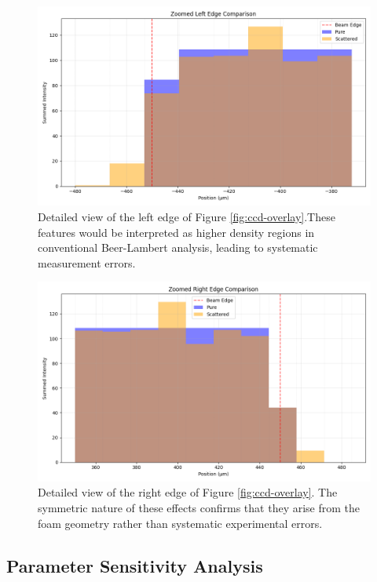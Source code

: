 \documentclass[twocolumn]{aastex701}
\begin{document}
\begin{figure}[htbp]
  \centering
  \includegraphics[width=\linewidth]{zoomed_left_edge_new.png}
  \caption{Detailed view of the left edge of Figure \ref{fig:ccd-overlay}.These features would be interpreted as higher density regions in conventional Beer-Lambert analysis, leading to systematic measurement errors.}
  \label{fig:ccd-left-edge}
\end{figure}

\begin{figure}[htbp]
  \centering
  \includegraphics[width=\linewidth]{zoomed_right_edge_new.png}
  \caption{Detailed view of the right edge of Figure \ref{fig:ccd-overlay}. The symmetric nature of these effects confirms that they arise from the foam geometry rather than systematic experimental errors.}
  \label{fig:ccd-right-edge}
\end{figure}

\subsection{Parameter Sensitivity Analysis}
\end{document}
